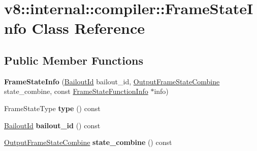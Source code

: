 \hypertarget{classv8_1_1internal_1_1compiler_1_1FrameStateInfo}{}\section{v8\+:\+:internal\+:\+:compiler\+:\+:Frame\+State\+Info Class Reference}
\label{classv8_1_1internal_1_1compiler_1_1FrameStateInfo}
\subsection*{Public Member Functions}
\begin{DoxyCompactItemize}
\item 
\mbox{\label{classv8_1_1internal_1_1compiler_1_1FrameStateInfo_af54c6c4cf164f0a1ddf5cda510f491cc}} 
{\bfseries Frame\+State\+Info} (\mbox{\hyperlink{classv8_1_1internal_1_1BailoutId}{Bailout\+Id}} bailout\+\_\+id, \mbox{\hyperlink{classv8_1_1internal_1_1compiler_1_1OutputFrameStateCombine}{Output\+Frame\+State\+Combine}} state\+\_\+combine, const \mbox{\hyperlink{classv8_1_1internal_1_1compiler_1_1FrameStateFunctionInfo}{Frame\+State\+Function\+Info}} $\ast$info)
\item 
\mbox{\label{classv8_1_1internal_1_1compiler_1_1FrameStateInfo_af3a5e00051a872dafc6664b0864ed70b}} 
Frame\+State\+Type {\bfseries type} () const
\item 
\mbox{\label{classv8_1_1internal_1_1compiler_1_1FrameStateInfo_ac0eee1a1c119dab694eac9ad2fbb5877}} 
\mbox{\hyperlink{classv8_1_1internal_1_1BailoutId}{Bailout\+Id}} {\bfseries bailout\+\_\+id} () const
\item 
\mbox{\label{classv8_1_1internal_1_1compiler_1_1FrameStateInfo_a6338f32fce8404f821be68ab49fed9be}} 
\mbox{\hyperlink{classv8_1_1internal_1_1compiler_1_1OutputFrameStateCombine}{Output\+Frame\+State\+Combine}} {\bfseries state\+\_\+combine} () const
\item 
\mbox{\label{classv8_1_1internal_1_1compiler_1_1FrameStateInfo_a748112020855b7147d5e4982e9336f2b}} 

\end{DoxyCompactItemize}

